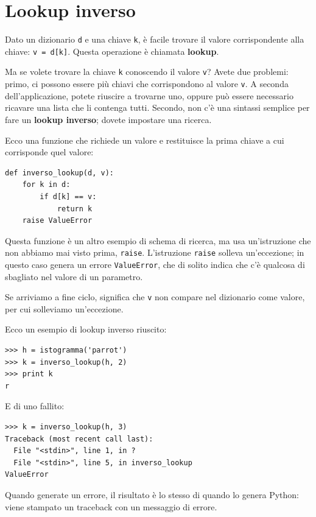 \documentclass[10pt]{book}
\begin{document}
\section{Lookup inverso}
\label{raise}

Dato un dizionario {\tt d} e una chiave {\tt k}, è facile trovare il valore corrispondente alla chiave: {\tt v = d[k]}.  Questa operazione è chiamata {\bf lookup}.

Ma se volete trovare la chiave {\tt k} conoscendo il valore {\tt v}?
Avete due problemi: primo, ci possono essere più chiavi che corrispondono al valore {\tt v}.  A seconda dell'applicazione, potete riuscire a trovarne uno, oppure può essere necessario ricavare una lista che li contenga tutti. Secondo, non c'è una sintassi semplice per fare un {\bf lookup inverso}; dovete impostare una ricerca.

Ecco una funzione che richiede un valore e restituisce la prima chiave a cui corrisponde quel valore:

\begin{verbatim}
def inverso_lookup(d, v):
    for k in d:
        if d[k] == v:
            return k
    raise ValueError
\end{verbatim}
%
Questa funzione è un altro esempio di schema di ricerca, ma usa un'istruzione che non abbiamo mai visto prima, {\tt raise}.  L'istruzione {\tt raise}
solleva un'eccezione; in questo caso genera un errore {\tt ValueError}, che di solito indica che c'è qualcosa di sbagliato nel valore di un parametro.

Se arriviamo a fine ciclo, significa che {\tt v}
non compare nel dizionario come valore, per cui solleviamo un'eccezione.

Ecco un esempio di lookup inverso riuscito:

\begin{verbatim}
>>> h = istogramma('parrot')
>>> k = inverso_lookup(h, 2)
>>> print k
r
\end{verbatim}
%
E di uno fallito:

\begin{verbatim}
>>> k = inverso_lookup(h, 3)
Traceback (most recent call last):
  File "<stdin>", line 1, in ?
  File "<stdin>", line 5, in inverso_lookup
ValueError
\end{verbatim}
%
Quando generate un errore, il risultato è lo stesso di quando lo genera Python: viene stampato un traceback con un messaggio di errore.
\end{document}
